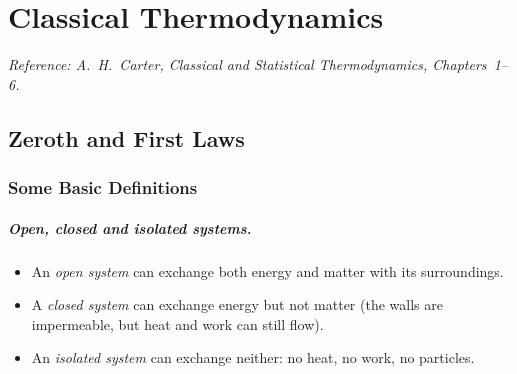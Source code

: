 
\providecommand{\dd}{\mathrm{d}}
\providecommand{\dbar}{\mathchar'26\mkern-12mu\mathrm{d}}  %
\providecommand{\pd}[2]{\dfrac{\partial #1}{\partial #2}}
\providecommand{\pa}[2]{\left(\dfrac{\partial #1}{\partial #2}\right)}

\chapter{Classical Thermodynamics}

\noindent\textit{Reference: A.~H.~Carter, \emph{Classical and Statistical Thermodynamics}, Chapters~1--6.}

\section{Zeroth and First Laws}

\subsection{Some Basic Definitions}

\paragraph{Open, closed and isolated systems.}
\begin{itemize}
    \item An \emph{open system} can exchange both energy and matter with its surroundings.
    \item A \emph{closed system} can exchange energy but not matter (the walls are impermeable, but heat and work can still flow).
    \item An \emph{isolated system} can exchange neither: no heat, no work, no particles.
\end{itemize}

